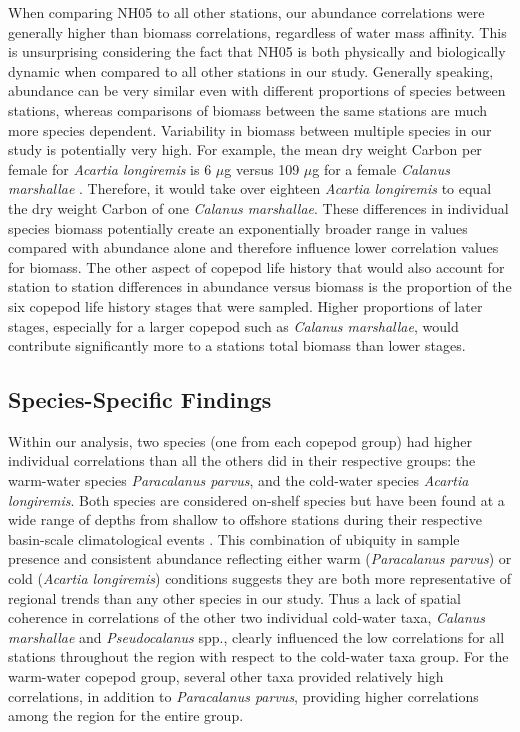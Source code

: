 \documentclass[preprint, authoryear, 12pt]{elsarticle}
\begin{document}
When comparing NH05 to all other stations, our abundance correlations were generally higher than biomass correlations, regardless of water mass affinity.  This is unsurprising considering the fact that NH05 is both physically and biologically dynamic when compared to all other stations in our study.  Generally speaking, abundance can be very similar even with different proportions of species between stations, whereas comparisons of biomass between the same stations are much more species dependent.  Variability in biomass between multiple species in our study is potentially very high.  For example, the mean dry weight Carbon per female for \textit{Acartia longiremis} is 6 $\mu$g \citep{uye1982length} versus 109 $\mu$g for a female \textit{Calanus marshallae} \citep{peterson1980life}.  Therefore, it would take over eighteen \textit{Acartia longiremis} to equal the dry weight Carbon of one \textit{Calanus marshallae}.  These differences in individual species biomass potentially create an exponentially broader range in values compared with abundance alone and therefore influence lower correlation values  for biomass. The other aspect of copepod life history that would also account for station to station differences in abundance versus biomass is the proportion of the six copepod life history stages that were sampled.  Higher proportions of later stages, especially for a larger copepod such as \textit{Calanus marshallae}, would contribute significantly more to a stations total biomass than lower stages.  

\subsection{Species-Specific Findings}


Within our analysis, two species (one from each copepod group) had higher individual correlations than all the others did in their respective groups: the warm-water species \textit{Paracalanus parvus}, and the cold-water species \textit{Acartia longiremis}.  Both species are considered on-shelf species but have been found at a wide range of depths from shallow to offshore stations during their respective basin-scale climatological events \citep{peterson2002effect, keister2003zonal}. This combination of ubiquity in sample presence and consistent abundance reflecting either warm (\textit{Paracalanus parvus}) or cold (\textit{Acartia longiremis}) conditions suggests they are both more representative of regional trends than any other species in our study.  Thus a lack of spatial coherence in correlations of the other two individual cold-water taxa, \textit{Calanus marshallae} and \textit{Pseudocalanus} spp., clearly influenced the low correlations for all stations throughout the region with respect to the cold-water taxa group.  For the warm-water copepod group, several other taxa provided relatively high correlations, in addition to \textit{Paracalanus parvus}, providing higher correlations among the region for the entire group. 
\end{document}
